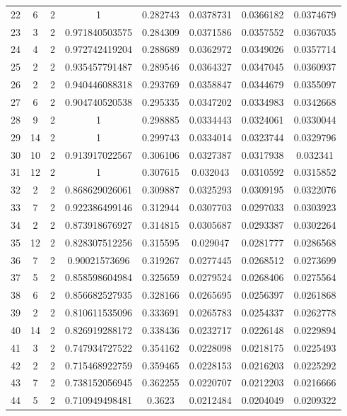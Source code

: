 \begin{longtable}{|c|c|c|c|c|c|c|c|}
22 & 6 & 2 & 1 & 0.282743 & 0.0378731 & 0.0366182 & 0.0374679 \\
23 & 3 & 2 & 0.971840503575 & 0.284309 & 0.0371586 & 0.0357552 & 0.0367035 \\
24 & 4 & 2 & 0.972742419204 & 0.288689 & 0.0362972 & 0.0349026 & 0.0357714 \\
25 & 2 & 2 & 0.935457791487 & 0.289546 & 0.0364327 & 0.0347045 & 0.0360937 \\
26 & 2 & 2 & 0.940446088318 & 0.293769 & 0.0358847 & 0.0344679 & 0.0355097 \\
27 & 6 & 2 & 0.904740520538 & 0.295335 & 0.0347202 & 0.0334983 & 0.0342668 \\
28 & 9 & 2 & 1 & 0.298885 & 0.0334443 & 0.0324061 & 0.0330044 \\
29 & 14 & 2 & 1 & 0.299743 & 0.0334014 & 0.0323744 & 0.0329796 \\
30 & 10 & 2 & 0.913917022567 & 0.306106 & 0.0327387 & 0.0317938 & 0.032341 \\
31 & 12 & 2 & 1 & 0.307615 & 0.032043 & 0.0310592 & 0.0315852 \\
32 & 2 & 2 & 0.868629026061 & 0.309887 & 0.0325293 & 0.0309195 & 0.0322076 \\
33 & 7 & 2 & 0.922386499146 & 0.312944 & 0.0307703 & 0.0297033 & 0.0303923 \\
34 & 2 & 2 & 0.873918676927 & 0.314815 & 0.0305687 & 0.0293387 & 0.0302264 \\
35 & 12 & 2 & 0.828307512256 & 0.315595 & 0.029047 & 0.0281777 & 0.0286568 \\
36 & 7 & 2 & 0.90021573696 & 0.319267 & 0.0277445 & 0.0268512 & 0.0273699 \\
37 & 5 & 2 & 0.858598604984 & 0.325659 & 0.0279524 & 0.0268406 & 0.0275564 \\
38 & 6 & 2 & 0.856682527935 & 0.328166 & 0.0265695 & 0.0256397 & 0.0261868 \\
39 & 2 & 2 & 0.810611535096 & 0.333691 & 0.0265783 & 0.0254337 & 0.0262778 \\
40 & 14 & 2 & 0.826919288172 & 0.338436 & 0.0232717 & 0.0226148 & 0.0229894 \\
41 & 3 & 2 & 0.747934727522 & 0.354162 & 0.0228098 & 0.0218175 & 0.0225493 \\
42 & 2 & 2 & 0.715468922759 & 0.359465 & 0.0228153 & 0.0216203 & 0.0225292 \\
43 & 7 & 2 & 0.738152056945 & 0.362255 & 0.0220707 & 0.0212203 & 0.0216666 \\
44 & 5 & 2 & 0.710949498481 & 0.3623 & 0.0212484 & 0.0204049 & 0.0209322 \\

\end{longtable}
